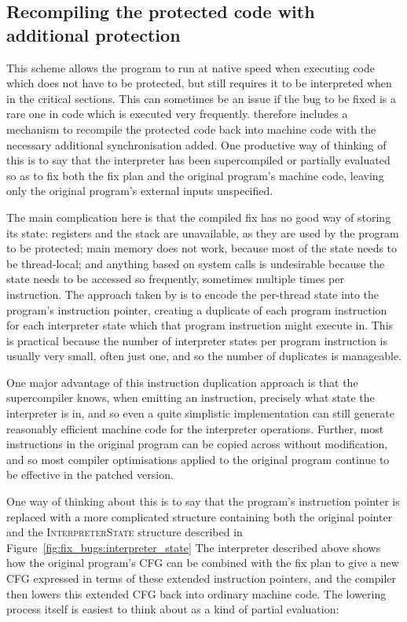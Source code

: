 \subsection{Recompiling the protected code with additional protection}

This scheme allows the program to run at native speed when executing
code which does not have to be protected, but still requires it to be
interpreted when in the critical sections.  This can sometimes be an
issue if the bug to be fixed is a rare one in code which is executed
very frequently.  {\Implementation} therefore includes a mechanism to
recompile the protected code back into machine code with the necessary
additional synchronisation added.  One productive way of thinking of
this is to say that the interpreter has been supercompiled or
partially evaluated so as to fix both the fix plan and the original
program's machine code, leaving only the original program's external
inputs unspecified.

The main complication here is that the compiled fix has no good way of
storing its state: registers and the stack are unavailable, as they
are used by the program to be protected; main memory does not work,
because most of the state needs to be thread-local; and anything based
on system calls is undesirable because the state needs to be accessed
so frequently, sometimes multiple times per instruction.  The approach
taken by {\implementation} is to encode the per-thread state into the
program's instruction pointer, creating a duplicate of each program
instruction for each interpreter state which that program instruction
might execute in.  This is practical because the number of interpreter
states per program instruction is usually very small, often just one,
and so the number of duplicates is manageable.

One major advantage of this instruction duplication approach is that
the supercompiler knows, when emitting an instruction, precisely what
state the interpreter is in, and so even a quite simplistic
implementation can still generate reasonably efficient machine code
for the interpreter operations.  Further, most instructions in the
original program can be copied across without modification, and so
most compiler optimisations applied to the original program continue
to be effective in the patched version.

One way of thinking about this is to say that the program's
instruction pointer is replaced with a more complicated structure
containing both the original pointer and the \textsc{InterpreterState}
structure described in Figure~\ref{fig:fix_bugs:interpreter_state} The
interpreter described above shows how the original program's CFG can
be combined with the fix plan to give a new CFG expressed in terms of
these extended instruction pointers, and the compiler then lowers this
extended CFG back into ordinary machine code.  The lowering process
itself is easiest to think about as a kind of partial evaluation:


